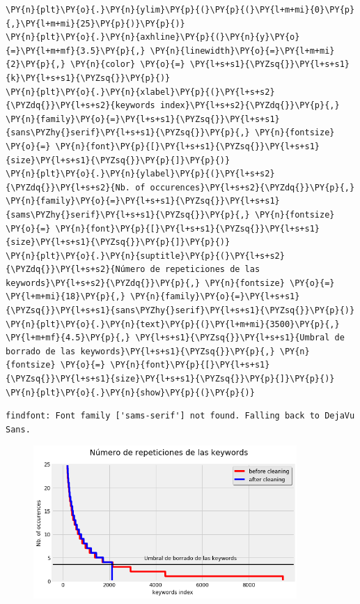 \begin{tcolorbox}[breakable, size=fbox, boxrule=1pt, pad at break*=1mm,colback=cellbackground, colframe=cellborder]
\begin{Verbatim}[commandchars=\\\{\}]
\PY{n}{plt}\PY{o}{.}\PY{n}{ylim}\PY{p}{(}\PY{p}{(}\PY{l+m+mi}{0}\PY{p}{,}\PY{l+m+mi}{25}\PY{p}{)}\PY{p}{)}
\PY{n}{plt}\PY{o}{.}\PY{n}{axhline}\PY{p}{(}\PY{n}{y}\PY{o}{=}\PY{l+m+mf}{3.5}\PY{p}{,} \PY{n}{linewidth}\PY{o}{=}\PY{l+m+mi}{2}\PY{p}{,} \PY{n}{color} \PY{o}{=} \PY{l+s+s1}{\PYZsq{}}\PY{l+s+s1}{k}\PY{l+s+s1}{\PYZsq{}}\PY{p}{)}
\PY{n}{plt}\PY{o}{.}\PY{n}{xlabel}\PY{p}{(}\PY{l+s+s2}{\PYZdq{}}\PY{l+s+s2}{keywords index}\PY{l+s+s2}{\PYZdq{}}\PY{p}{,} \PY{n}{family}\PY{o}{=}\PY{l+s+s1}{\PYZsq{}}\PY{l+s+s1}{sans\PYZhy{}serif}\PY{l+s+s1}{\PYZsq{}}\PY{p}{,} \PY{n}{fontsize} \PY{o}{=} \PY{n}{font}\PY{p}{[}\PY{l+s+s1}{\PYZsq{}}\PY{l+s+s1}{size}\PY{l+s+s1}{\PYZsq{}}\PY{p}{]}\PY{p}{)}
\PY{n}{plt}\PY{o}{.}\PY{n}{ylabel}\PY{p}{(}\PY{l+s+s2}{\PYZdq{}}\PY{l+s+s2}{Nb. of occurences}\PY{l+s+s2}{\PYZdq{}}\PY{p}{,} \PY{n}{family}\PY{o}{=}\PY{l+s+s1}{\PYZsq{}}\PY{l+s+s1}{sams\PYZhy{}serif}\PY{l+s+s1}{\PYZsq{}}\PY{p}{,} \PY{n}{fontsize} \PY{o}{=} \PY{n}{font}\PY{p}{[}\PY{l+s+s1}{\PYZsq{}}\PY{l+s+s1}{size}\PY{l+s+s1}{\PYZsq{}}\PY{p}{]}\PY{p}{)}
\PY{n}{plt}\PY{o}{.}\PY{n}{suptitle}\PY{p}{(}\PY{l+s+s2}{\PYZdq{}}\PY{l+s+s2}{Número de repeticiones de las keywords}\PY{l+s+s2}{\PYZdq{}}\PY{p}{,} \PY{n}{fontsize} \PY{o}{=} \PY{l+m+mi}{18}\PY{p}{,} \PY{n}{family}\PY{o}{=}\PY{l+s+s1}{\PYZsq{}}\PY{l+s+s1}{sans\PYZhy{}serif}\PY{l+s+s1}{\PYZsq{}}\PY{p}{)}
\PY{n}{plt}\PY{o}{.}\PY{n}{text}\PY{p}{(}\PY{l+m+mi}{3500}\PY{p}{,} \PY{l+m+mf}{4.5}\PY{p}{,} \PY{l+s+s1}{\PYZsq{}}\PY{l+s+s1}{Umbral de borrado de las keywords}\PY{l+s+s1}{\PYZsq{}}\PY{p}{,} \PY{n}{fontsize} \PY{o}{=} \PY{n}{font}\PY{p}{[}\PY{l+s+s1}{\PYZsq{}}\PY{l+s+s1}{size}\PY{l+s+s1}{\PYZsq{}}\PY{p}{]}\PY{p}{)}
\PY{n}{plt}\PY{o}{.}\PY{n}{show}\PY{p}{(}\PY{p}{)}
\end{Verbatim}
\end{tcolorbox}

    \begin{Verbatim}[commandchars=\\\{\}]
findfont: Font family ['sams-serif'] not found. Falling back to DejaVu Sans.
\end{Verbatim}

\begin{figure}[h]
    \centering
    \captionsetup{width=10cm}
    \includegraphics[width=10cm]{./contenido/imagenes/output_62_1.png}

\end{figure}
    { \hspace*{\fill} \\}
    
